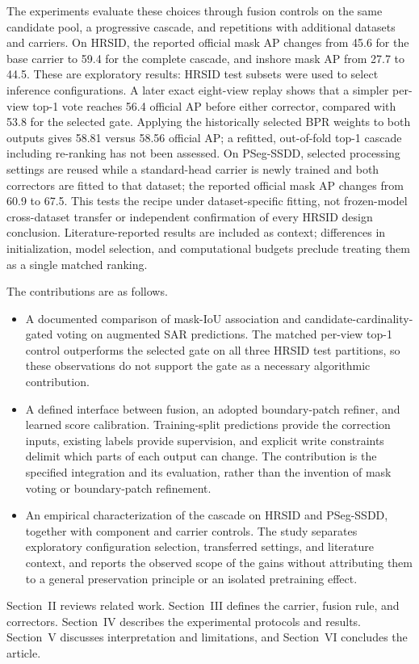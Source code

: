 The experiments evaluate these choices through fusion controls on the same candidate pool, a progressive cascade, and repetitions with additional datasets and carriers. On HRSID, the reported official mask AP changes from 45.6 for the base carrier to 59.4 for the complete cascade, and inshore mask AP from 27.7 to 44.5. These are exploratory results: HRSID test subsets were used to select inference configurations. A later exact eight-view replay shows that a simpler per-view top-1 vote reaches 56.4 official AP before either corrector, compared with 53.8 for the selected gate. Applying the historically selected BPR weights to both outputs gives 58.81 versus 58.56 official AP; a refitted, out-of-fold top-1 cascade including re-ranking has not been assessed. On PSeg-SSDD, selected processing settings are reused while a standard-head carrier is newly trained and both correctors are fitted to that dataset; the reported official mask AP changes from 60.9 to 67.5. This tests the recipe under dataset-specific fitting, not frozen-model cross-dataset transfer or independent confirmation of every HRSID design conclusion. Literature-reported results are included as context; differences in initialization, model selection, and computational budgets preclude treating them as a single matched ranking.

The contributions are as follows.
\begin{itemize}
\item A documented comparison of mask-IoU association and candidate-cardinality-gated voting on augmented SAR predictions. The matched per-view top-1 control outperforms the selected gate on all three HRSID test partitions, so these observations do not support the gate as a necessary algorithmic contribution.
\item A defined interface between fusion, an adopted boundary-patch refiner, and learned score calibration. Training-split predictions provide the correction inputs, existing labels provide supervision, and explicit write constraints delimit which parts of each output can change. The contribution is the specified integration and its evaluation, rather than the invention of mask voting or boundary-patch refinement.
\item An empirical characterization of the cascade on HRSID and PSeg-SSDD, together with component and carrier controls. The study separates exploratory configuration selection, transferred settings, and literature context, and reports the observed scope of the gains without attributing them to a general preservation principle or an isolated pretraining effect.
\end{itemize}

Section~II reviews related work. Section~III defines the carrier, fusion rule, and correctors. Section~IV describes the experimental protocols and results. Section~V discusses interpretation and limitations, and Section~VI concludes the article.
